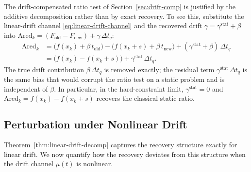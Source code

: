 \documentclass[11pt,a4paper]{article}
\begin{document}
The drift-compensated ratio test of
Section~\ref{sec:drift-comp} is justified by the additive
decomposition rather than by exact recovery. To see this,
substitute the linear-drift channel
\eqref{eq:linear-drift-channel} and the recovered drift
$\gamma = \gamma^{\mathrm{stat}} + \beta$ into
$\mathrm{Ared}_k = (F_{\mathrm{old}} - F_{\mathrm{new}})
+ \gamma\,\Delta t_q$:
\begin{align*}
  \mathrm{Ared}_k
  &= \bigl(f(x_k) + \beta\,t_{\mathrm{old}}\bigr)
   - \bigl(f(x_k + s) + \beta\,t_{\mathrm{new}}\bigr)
   + (\gamma^{\mathrm{stat}} + \beta)\,\Delta t_q \\
  &= \bigl(f(x_k) - f(x_k + s)\bigr)
   + \gamma^{\mathrm{stat}}\,\Delta t_q.
\end{align*}
The true drift contribution $\beta\,\Delta t_q$ is removed
exactly; the residual term $\gamma^{\mathrm{stat}}\,\Delta t_q$
is the same bias that would corrupt the ratio test on a static
problem and is independent of $\beta$. In particular, in the
hard-constraint limit, $\gamma^{\mathrm{stat}} = 0$ and
$\mathrm{Ared}_k = f(x_k) - f(x_k + s)$ recovers the classical
static ratio.

\subsection{Perturbation under Nonlinear Drift}
\label{sec:nonlinear-drift}

Theorem~\ref{thm:linear-drift-decomp} captures the recovery
structure exactly for linear drift. We now quantify how the
recovery deviates from this structure when the drift channel
$\mu(t)$ is nonlinear.
\end{document}
